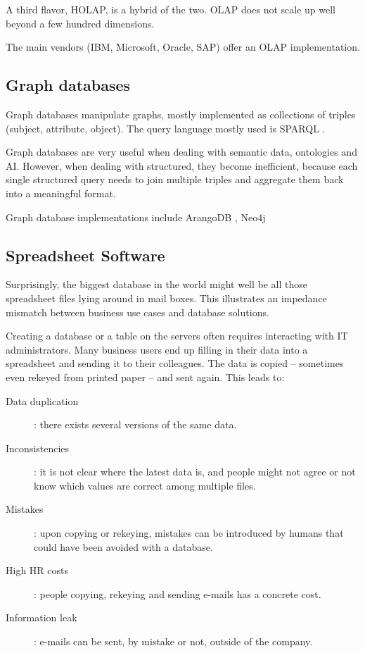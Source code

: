 \documentclass{vldb}
\begin{document}
A third flavor, HOLAP, is a hybrid of the two. OLAP does not scale up well beyond a few hundred dimensions.

The main vendors (IBM, Microsoft, Oracle, SAP) offer an OLAP implementation.

\subsection{Graph databases}

Graph databases manipulate graphs, mostly implemented as collections of triples (subject, attribute, object). The query language mostly used is SPARQL \cite{SPARQL}.

Graph databases are very useful when dealing with semantic data, ontologies and AI. However, when dealing with structured, they become inefficient, because each single structured query needs to join multiple triples and aggregate them back into a meaningful format.

Graph database implementations include ArangoDB \cite{ArangoDB}, Neo4j \cite{Neo4j}

\subsection{Spreadsheet Software}

Surprisingly, the biggest database in the world might well be all those spreadsheet files lying around in mail boxes. This illustrates an impedance mismatch between business use cases and database solutions.

Creating a database or a table on the servers often requires interacting with IT administrators. Many business users end up filling in their data into a spreadsheet and sending it to their colleagues. The data is copied -- sometimes even rekeyed from printed paper -- and sent again. This leads to:

\begin{description}
\item[Data duplication]: there exists several versions of the same data.
\item [Inconsistencies]: it is not clear where the latest data is, and people might not agree or not know which values are correct among multiple files.
\item[Mistakes]: upon copying or rekeying, mistakes can be introduced by humans that could have been avoided with a database.
\item[High HR costs]: people copying, rekeying and sending e-mails has a concrete cost.
\item[Information leak]: e-mails can be sent, by mistake or not, outside of the company.
\end{description}
\end{document}
